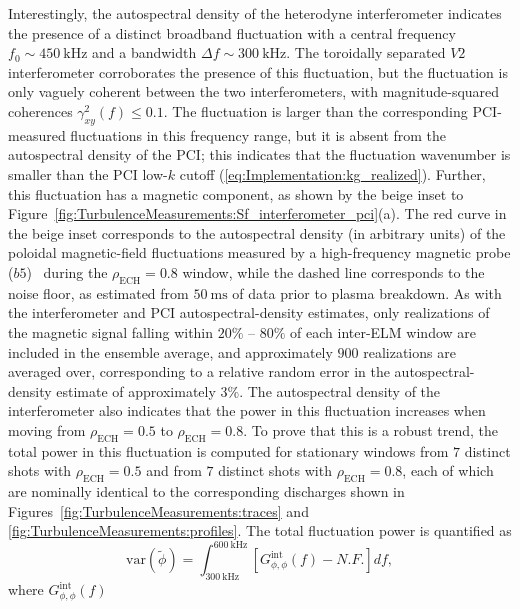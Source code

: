 Interestingly, the autospectral density of the heterodyne interferometer
indicates the presence of a distinct broadband fluctuation
with a central frequency $f_0 \sim \SI{450}{\kilo\hertz}$ and
a bandwidth $\Delta f \sim \SI{300}{\kilo\hertz}$.
The toroidally separated $V2$ interferometer
corroborates the presence of this fluctuation, but
the fluctuation is only vaguely coherent between the two interferometers,
with magnitude-squared coherences $\gamma_{xy}^2(f) \leq 0.1$.
The fluctuation is larger than
the corresponding PCI-measured fluctuations
in this frequency range, but
it is absent from the autospectral density of the PCI;
this indicates that the fluctuation wavenumber
is smaller than the PCI low-$k$ cutoff
(\ref{eq:Implementation:kg_realized}).
Further, this fluctuation has a magnetic component,
as shown by the beige inset to
Figure~\ref{fig:TurbulenceMeasurements:Sf_interferometer_pci}(a).
The red curve in the beige inset
corresponds to the autospectral density (in arbitrary units)
of the poloidal magnetic-field fluctuations
measured by a high-frequency magnetic probe ($b5$)~\cite{strait_rsi06}
during the $\rho_{\text{ECH}} = 0.8$ window, while
the dashed line corresponds to the noise floor,
as estimated from $\SI{50}{\milli\second}$
of data prior to plasma breakdown.
As with the interferometer and PCI autospectral-density estimates,
only realizations of the magnetic signal falling within
$20\%$ -- $80\%$ of each inter-ELM window
are included in the ensemble average, and
approximately $900$ realizations are averaged over,
corresponding to a relative random error
in the autospectral-density estimate of approximately $3\%$.
The autospectral density of the interferometer also
indicates that the power in this fluctuation
increases when moving from
$\rho_{\text{ECH}} = 0.5$ to $\rho_{\text{ECH}} = 0.8$.
To prove that this is a robust trend,
the total power in this fluctuation
is computed for stationary windows
from $7$ distinct shots with $\rho_{\text{ECH}} = 0.5$ and
from $7$ distinct shots with $\rho_{\text{ECH}} = 0.8$,
each of which are nominally identical
to the corresponding discharges shown in
Figures~\ref{fig:TurbulenceMeasurements:traces} and
\ref{fig:TurbulenceMeasurements:profiles}.
The total fluctuation power is quantified as
\begin{equation}
  \text{var}(\tilde{\phi})
  =
  \int_{\SI{300}{\kilo\hertz}}^{\SI{600}{\kilo\hertz}}
  \left[%
    G_{\phi,\phi}^{\text{int}}(f) - N.F.
  \right] df,
  \label{eq:TurbulenceMeasurements:MTM_power}
\end{equation}
where $G_{\phi,\phi}^{\text{int}}(f)$
